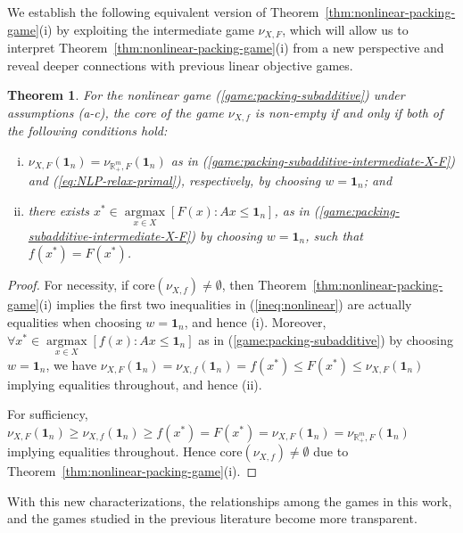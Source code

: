 \documentclass[11pt]{article}\usepackage[]{graphicx}\usepackage[]{xcolor}
\newtheorem{thm}{Theorem}
\DeclareMathOperator*{\argmax}{argmax}
\begin{document}
We establish the following equivalent version of Theorem~\ref{thm:nonlinear-packing-game}(i) by exploiting the intermediate game $\nu_{X, F}$, which will allow us to interpret Theorem~\ref{thm:nonlinear-packing-game}(i) from a new perspective and reveal deeper connections with previous linear objective games.
\begin{thm}\label{corr:packing-subadditive-intermediate-sandwich-equi} For the nonlinear game (\ref{game:packing-subadditive}) under assumptions (a-c), the core of the game $\nu_{X, f}$ is non-empty if and only if both of the following conditions hold:
\begin{enumerate}[(i)]
\item $\nu_{X, F}\left(\mathbf{1}_n\right)=\nu_{\mathbb{R}^m_{+}, F}\left(\mathbf{1}_n\right)$ as in (\ref{game:packing-subadditive-intermediate-X-F}) and (\ref{eq:NLP-relax-primal}), respectively, by choosing $w=\mathbf{1}_n$; and
\item there exists $x^*\in \argmax\limits_{x\in X} \left[F(x): Ax\le \mathbf{1}_n\right]$, as in (\ref{game:packing-subadditive-intermediate-X-F}) by choosing $w=\mathbf{1}_n$, such that $f(x^*)=F(x^*)$.
\end{enumerate}
\end{thm}
\begin{proof}
For necessity, if $\text{core}\left(\nu_{X, f}\right)\ne\emptyset$, then Theorem~\ref{thm:nonlinear-packing-game}(i) implies the first two inequalities in (\ref{ineq:nonlinear}) are actually equalities when choosing $w=\mathbf{1}_n$, and hence (i). Moreover, $\forall x^*\in \argmax\limits_{x\in X} \left[f(x): Ax\le \mathbf{1}_n\right]$ as in (\ref{game:packing-subadditive}) by choosing $w=\mathbf{1}_n$, we have $\nu_{X, F}\left(\mathbf{1}_n\right)=\nu_{X, f}\left(\mathbf{1}_n\right)=f(x^*)\le F(x^*)\le \nu_{X, F}\left(\mathbf{1}_n\right)$ implying equalities throughout, and hence (ii).

For sufficiency, $\nu_{X, F}\left(\mathbf{1}_n\right)\ge \nu_{X, f}\left(\mathbf{1}_n\right)\ge f(x^*)=F(x^*) =\nu_{X, F}\left(\mathbf{1}_n\right)=\nu_{\mathbb{R}^m_{+}, F}\left(\mathbf{1}_n\right)$ implying equalities throughout. Hence $\text{core}\left(\nu_{X, f}\right)\ne\emptyset$ due to Theorem~\ref{thm:nonlinear-packing-game}(i).
\end{proof}




With this new characterizations, the relationships among the games in this work, and the games studied in the previous literature become more transparent. 
\end{document}

